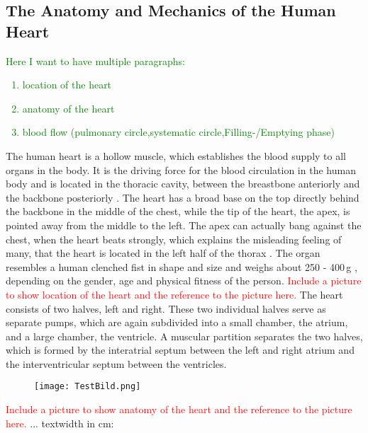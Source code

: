 \subsection{The Anatomy and Mechanics of the Human Heart}
\label{anatomy}
\textcolor{green}{
	Here I want to have multiple paragraphs:
	\begin{enumerate}
  		\item location of the heart  
  		\item anatomy of the heart
  		\item blood flow (pulmonary circle,systematic circle,Filling-/Emptying phase)
	\end{enumerate}
}
The human heart is a hollow muscle, which establishes the blood supply to all organs in the body. It is the driving force for the blood circulation in the human body and is located in the thoracic cavity, between the breastbone anteriorly and the backbone posteriorly \cite{sherwood07}. The heart has a broad base on the top directly behind the backbone in the middle of the chest, while the tip of the heart, the apex, is pointed away from the middle to the left. The apex can actually bang against the chest, when the heart beats strongly, which explains the misleading feeling of many, that the heart is located in the left half of the thorax \cite{sherwood07}. The organ resembles a human clenched fist in shape and size and weighs about 250 - 400\,g \cite{schwegler11}, depending on the gender, age and physical fitness of the person. \textcolor{red}{Include a picture to show location of the heart and the reference to the picture here.} 
\newline
The heart consists of two halves, left and right. These two individual halves serve as separate pumps, which are again subdivided into a small chamber, the atrium, and a large chamber, the ventricle. A muscular partition separates the two halves, which is formed by the interatrial septum between the left and right atrium and the interventricular septum between the ventricles.
\begin{figure}
\texttt{[image: TestBild.png]}
\end{figure}
\textcolor{red}{Include a picture to show anatomy of the heart and the reference to the picture here.} 
\newline
...
textwidth in cm: \prntlen{\textwidth}



